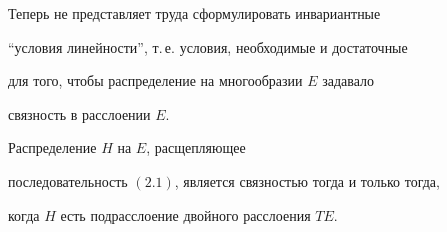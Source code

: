 

 


Теперь не представляет труда сформулировать инвариантные 


``условия линейности'', т.\,е. условия, необходимые и достаточные 


для того, чтобы распределение на многообразии $E$ задавало  


связность в расслоении $E$. 


 


\begin{thms} Распределение $H$ на $E$, расщепляющее  


последовательность $(2.1)$, является связностью тогда и только тогда, 


когда $H$ есть подрасслоение двойного расслоения $TE$. 


\end{thms} 


 


